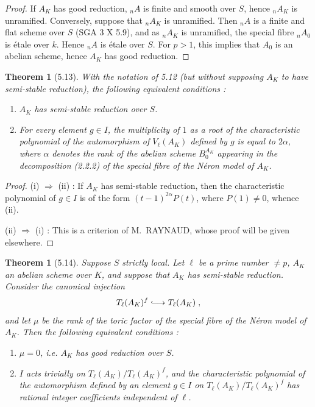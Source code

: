 \documentclass[11pt]{article}
\theoremstyle{plain}
\newtheorem{theoreme}[theorem]{Theorem}
\theoremstyle{definition}
\theoremstyle{remark}
\newcommand{\Tl}{T_\ell}
\begin{document}
\begin{proof}
If $A_K$ has good reduction, ${}_n A$ is finite and smooth over $S$, hence
${}_n A_K$ is unramified. Conversely, suppose that ${}_n A_K$ is
unramified. Then ${}_n A$ is a finite and flat scheme over $S$ (SGA 3 X
5.9), and as ${}_n A_K$ is unramified, the special fibre ${}_n A_0$ is
\'etale over $k$. Hence ${}_n A$ is \'etale over $S$. For $p > 1$, this
implies that $A_0$ is an abelian scheme, hence $A_K$ has good
reduction.
\end{proof}

\begin{theoreme}[5.13]
With the notation of \emph{5.12} (but without supposing $A_K$ to have
semi-stable reduction), the following equivalent conditions :
\begin{enumerate}[label=\emph{(\roman*)}]
\item $A_K$ has \emph{semi-stable reduction} over $S$.
\item For every element $g \in I$, the multiplicity of $1$ as a root
of the characteristic polynomial of the automorphism of
$V_{\ell}(A_K)$ defined by $g$ is equal to $2\alpha$, where $\alpha$
denotes the rank of the abelian scheme $B_0^{A_K}$ appearing in the
decomposition (2.2.2) of the special fibre of the N\'eron model of
$A_K$.
\end{enumerate}
\end{theoreme}

\begin{proof}
(i) $\Rightarrow$ (ii) : If $A_K$ has semi-stable reduction, then the
characteristic polynomial of $g \in I$ is of the form
$(t-1)^{2\alpha} P(t)$, where $P(1) \neq 0$, whence (ii).

(ii) $\Rightarrow$ (i) : This is a criterion of M.~RAYNAUD, whose
proof will be given elsewhere.
\end{proof}

\begin{theoreme}[5.14]
Suppose $S$ strictly local. Let $\ell$ be a prime number $\neq p$, $A_K$
an abelian scheme over $K$, and suppose that $A_K$ has semi-stable
reduction. Consider the canonical injection
\begin{equation}
\Tl(A_K)^f \lhook\joinrel\longrightarrow \Tl(A_K) \; ,
\end{equation}
and let $\mu$ be the rank of the toric factor of the special fibre of
the N\'eron model of $A_K$. Then the following equivalent conditions :
\begin{enumerate}[label=\emph{(\roman*)}]
\item $\mu = 0$, i.e. $A_K$ has \emph{good reduction} over $S$.
\item $I$ acts trivially on $\Tl(A_K)/\Tl(A_K)^f$, and the
characteristic polynomial of the automorphism defined by an element $g
\in I$ on $\Tl(A_K)/\Tl(A_K)^f$ has rational integer coefficients
independent of $\ell$.
\end{enumerate}
\end{theoreme}
\end{document}
